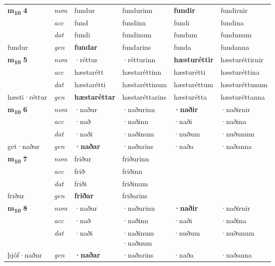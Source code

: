 \begin{longtable}[l]{X>{\footnotesize\itshape}XXXXX}
\multirow{3}{*}{{{\textbf{m{\textsubscript{10}}} \Large{\textbf{4}}}}} & nom & fundur & fundurinn & \textbf{fundir} & fundirnir \\*
 & acc & fund & fundinn & fundi & fundina \\*
 & dat & fundi & fundinum & fundum & fundunum \\*
 {\footnotesize{fundur}} & gen & \textbf{fundar} & fundarins & funda & fundanna \\
\midrule

\multirow{3}{*}{{{\textbf{m{\textsubscript{10}}} \Large{\textbf{5}}}}} & nom & ·réttur & ·rétturinn & \textbf{hæsturéttir} & hæsturéttirnir \\*
 & acc & hæstarétt & hæstaréttinn & hæsturétti & hæsturéttina \\*
 & dat & hæstarétti & hæstaréttinum & hæsturéttum & hæsturéttunum \\*
 {\footnotesize{hæsti\allowbreak ·réttur}} & gen & \textbf{hæstaréttar} & hæstaréttarins & hæsturétta & hæsturéttanna \\
\midrule

\multirow{3}{*}{{{\textbf{m{\textsubscript{10}}} \Large{\textbf{6}}}}} & nom & ·naður & ·naðurinn & \textbf{·naðir} & ·naðirnir \\*
 & acc & ·nað & ·naðinn & ·naði & ·naðina \\*
 & dat & ·naði & ·naðinum & ·nuðum & ·nuðunum \\*
 {\footnotesize{get\allowbreak ·naður}} & gen & \textbf{·naðar} & ·naðarins & ·naða & ·naðanna \\
\midrule

\multirow{3}{*}{{{\textbf{m{\textsubscript{10}}} \Large{\textbf{7}}}}} & nom & friður & friðurinn & \textbf{} &  \\*
 & acc & frið & friðinn &  &  \\*
 & dat & friði & friðinum &  &  \\*
 {\footnotesize{friður}} & gen & \textbf{friðar} & friðarins &  &  \\
\midrule

\multirow{3}{*}{{{\textbf{m{\textsubscript{10}}} \Large{\textbf{8}}}}} & nom & ·naður & ·naðurinn & \textbf{·naðir} & ·naðirnir \\*
 & acc & ·nað & ·naðinn & ·naði & ·naðina \\*
 & dat & ·naði & \specialcell{·naðinum\\  ·naðnum} & ·nuðum & ·nuðunum \\*
 {\footnotesize{þjóf\allowbreak ·naður}} & gen & \textbf{·naðar} & ·naðarins & ·naða & ·naðanna \\
\midrule


\end{longtable}
